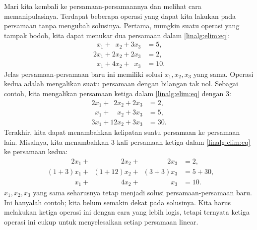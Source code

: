 \medskip

Mari kita kembali ke persamaan-persamaannya dan melihat cara memanipulasinya.
Terdapat beberapa operasi yang dapat kita lakukan pada persamaan tanpa mengubah
solusinya. Pertama, mungkin suatu operasi yang tampak bodoh, kita dapat menukar
dua persamaan dalam \eqref{linalg:elim:eq}:
\begin{equation*}
\begin{aligned}
\phantom{9} x_1 + \phantom{9} x_2 +           3 x_3 & = 5 , \\
          2 x_1 +           2 x_2 +           2 x_3 & = 2 , \\
\phantom{9} x_1 +           4 x_2 + \phantom{9} x_3 & = 10 .
\end{aligned}
\end{equation*}
Jelas persamaan-persamaan baru ini memiliki solusi $x_1,x_2,x_3$ yang sama.
Operasi kedua adalah mengalikan suatu persamaan dengan bilangan tak nol. Sebagai
contoh, kita mengalikan persamaan ketiga dalam \eqref{linalg:elim:eq}
dengan 3:
\begin{equation*}
\begin{aligned}
          2 x_1 + \phantom{9}  2 x_2 + 2 x_3 & = 2 , \\
\phantom{9} x_1 + \phantom{99}   x_2 + 3 x_3 & = 5 , \\
          3 x_1 +             12 x_2 + 3 x_3 & = 30 .
\end{aligned}
\end{equation*}
Terakhir, kita dapat menambahkan kelipatan suatu persamaan ke persamaan lain.
Misalnya, kita menambahkan 3 kali persamaan ketiga dalam \eqref{linalg:elim:eq}
ke persamaan kedua:
\begin{equation*}
\begin{aligned}
\phantom{(1+3)} 2 x_1 + \phantom{(1+12)}  2 x_2 + \phantom{(3+3)} 2 x_3 & = 2 , \\
\phantom{2} (1+3) x_1 + \phantom{2}(1+12)   x_2 + \phantom{2} (3+3) x_3 & = 5+30 , \\
\phantom{2 (1+3)} x_1 + \phantom{(1+12)}  4 x_2 + \phantom{(3+3) 2} x_3 & = 10 .
\end{aligned}
\end{equation*}
$x_1,x_2,x_3$ yang sama seharusnya tetap menjadi solusi
persamaan-persamaan baru.
Ini hanyalah contoh; kita belum semakin dekat pada solusinya.
Kita harus melakukan ketiga operasi ini dengan cara yang lebih logis,
tetapi ternyata
ketiga operasi ini cukup untuk menyelesaikan setiap persamaan linear.

